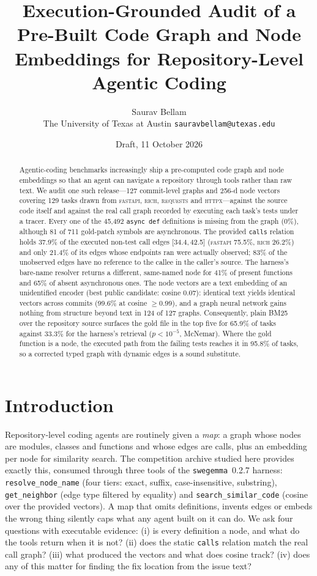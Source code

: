 \documentclass[10pt,a4paper]{article}
\title{Execution-Grounded Audit of a Pre-Built Code Graph and Node Embeddings for Repository-Level Agentic Coding}
\author{Saurav Bellam\\ \small The University of Texas at Austin \quad \texttt{sauravbellam@utexas.edu}}
\date{Draft, 11 October 2026}
\newcommand{\ci}[2]{{\footnotesize[#1,\,#2]}}
\begin{document}
\maketitle

\begin{abstract}
Agentic-coding benchmarks increasingly ship a pre-computed code graph and node embeddings so that an agent can navigate a repository through tools rather than raw text. We audit one such release---127 commit-level graphs and 256-d node vectors covering 129 tasks drawn from \textsc{fastapi}, \textsc{rich}, \textsc{requests} and \textsc{httpx}---against the source code itself and against the real call graph recorded by executing each task's tests under a tracer. Every one of the 45{,}492 \texttt{async def} definitions is missing from the graph (0\%), although 81 of 711 gold-patch symbols are asynchronous. The provided \texttt{calls} relation holds 37.9\% of the executed non-test call edges \ci{34.4}{42.5} (\textsc{fastapi} 75.5\%, \textsc{rich} 26.2\%) and only 21.4\% of its edges whose endpoints ran were actually observed; 83\% of the unobserved edges have no reference to the callee in the caller's source. The harness's bare-name resolver returns a different, same-named node for 41\% of present functions and 65\% of absent asynchronous ones. The node vectors are a text embedding of an unidentified encoder (best public candidate: cosine 0.07): identical text yields identical vectors across commits (99.6\% at cosine $\ge$0.99), and a graph neural network gains nothing from structure beyond text in 124 of 127 graphs. Consequently, plain BM25 over the repository source surfaces the gold file in the top five for 65.9\% of tasks against 33.3\% for the harness's retrieval ($p<10^{-5}$, McNemar). Where the gold function is a node, the executed path from the failing tests reaches it in 95.8\% of tasks, so a corrected typed graph with dynamic edges is a sound substitute.
\end{abstract}

\section{Introduction}
Repository-level coding agents are routinely given a \emph{map}: a graph whose nodes are modules, classes and functions and whose edges are calls, plus an embedding per node for similarity search. The competition archive studied here provides exactly this, consumed through three tools of the \texttt{swegemma}~0.2.7 harness: \texttt{resolve\_node\_name} (four tiers: exact, suffix, case-insensitive, substring), \texttt{get\_neighbor} (edge type filtered by equality) and \texttt{search\_similar\_code} (cosine over the provided vectors). A map that omits definitions, invents edges or embeds the wrong thing silently caps what any agent built on it can do. We ask four questions with executable evidence: (i) is every definition a node, and what do the tools return when it is not? (ii) does the static \texttt{calls} relation match the real call graph? (iii) what produced the vectors and what does cosine track? (iv) does any of this matter for finding the fix location from the issue text?
\end{document}
